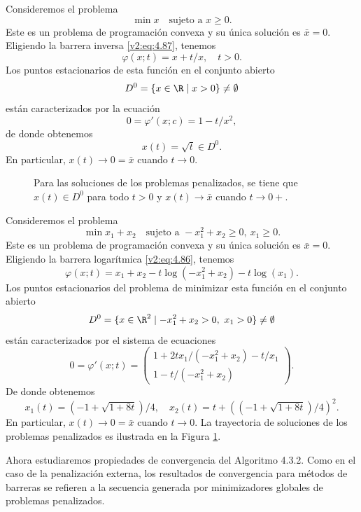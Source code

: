 \begin{example}\label{v2:exa:4.3.4}
    Consideremos el problema
    \[
        \min x \quad \text{sujeto a } x \ge 0.
    \]
    Este es un problema de programación convexa y su única solución es $\bar{x} = 0$.
    Eligiendo la barrera inversa \eqref{v2:eq:4.87}, tenemos
    \[
        \varphi(x; t) = x + t/x, \quad t > 0.
    \]
    Los puntos estacionarios de esta función en el conjunto abierto
    \[
        D^0 = \{x \in \R \mid x > 0\} \neq \emptyset
    \]
    están caracterizados por la ecuación
    \[
        0 = \varphi'(x; c) = 1 - t/x^2,
    \]
    de donde obtenemos
    \[
        x(t) = \sqrt{t} \in D^0.
    \]
    En particular, $x(t) \to 0 = \bar{x}$ cuando $t \to 0$.
\end{example}

\begin{figure}[htpb]
    \centering
    \caption{Para las soluciones de los problemas penalizados, se tiene que $x(t) \in D^0$ para todo $t > 0$ y $x(t) \to \bar{x}$ cuando $t \to 0+$.}
    \label{v2:fig:4.3.6}
\end{figure}

\begin{example}\label{v2:exa:4.3.5}
    Consideremos el problema
    \[
        \min x_1 + x_2 \quad \text{sujeto a } -x_1^2 + x_2 \ge 0, \ x_1 \ge 0.
    \]
    Este es un problema de programación convexa y su única solución es $\bar{x} = 0$.
    Eligiendo la barrera logarítmica \eqref{v2:eq:4.86}, tenemos
    \[
        \varphi(x; t) = x_1 + x_2 - t \log(-x_1^2 + x_2) - t \log(x_1).
    \]
    Los puntos estacionarios del problema de minimizar esta función en el conjunto abierto
    \[
        D^0 = \{x \in \R^2 \mid -x_1^2 + x_2 > 0, \ x_1 > 0\} \neq \emptyset
    \]
    están caracterizados por el sistema de ecuaciones
    \[
        0 = \varphi'(x; t) = \begin{pmatrix} 1 + 2tx_1/(-x_1^2 + x_2) - t/x_1 \\ 1 - t/(-x_1^2 + x_2) \end{pmatrix}.
    \]
    De donde obtenemos
    \[
        x_1(t) = (-1 + \sqrt{1 + 8t})/4, \quad x_2(t) = t + ((-1 + \sqrt{1 + 8t})/4)^2.
    \]
    En particular, $x(t) \to 0 = \bar{x}$ cuando $t \to 0$.
    La trayectoria de soluciones de los problemas penalizados es ilustrada en la Figura \ref{v2:fig:4.3.6}.
\end{example}

Ahora estudiaremos propiedades de convergencia del Algoritmo 4.3.2. Como en el caso de la penalización externa, los resultados de convergencia para métodos de barreras se refieren a la secuencia generada por minimizadores globales de problemas penalizados.

